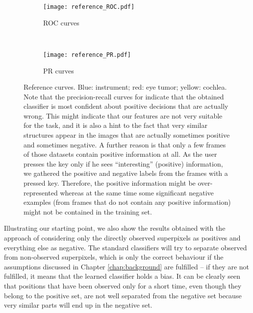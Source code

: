 \begin{figure}[ht]
	\centering
	\begin{subfigure}[h]{0.45\textwidth}
	\texttt{[image: reference\_ROC.pdf]}	
		\caption*{ROC curves}
	\end{subfigure}
	~
	\begin{subfigure}[h]{0.45\textwidth}
	\texttt{[image: reference\_PR.pdf]}	
		\caption*{PR curves}
	\end{subfigure}
	\caption{Reference curves. Blue: instrument; red: eye tumor; yellow: cochlea. Note that the precision-recall curves for indicate that the obtained classifier is most confident about positive decisions that are actually wrong. This might indicate that our features are not very suitable for the task, and it is also a hint to the fact that very similar structures appear in the images that are actually sometimes positive and sometimes negative. A further reason is that only a few frames of those datasets contain positive information at all. As the user presses the key only if he sees ``interesting'' (positive) information, we gathered the positive and negative labels from the frames with a pressed key. Therefore, the positive information might be over-represented whereas at the same time some significant negative examples (from frames that do not contain any positive information) might not be contained in the training set.}
	\label{fig:loss-functions-comparisons}
\end{figure}

Illustrating our starting point, we also show the results obtained with the approach of considering only the directly observed superpixels as positives and everything else as negative. The standard classifiers will try to separate observed from non-observed superpixels, which is only the correct behaviour if the assumptions discussed in Chapter \ref{chap:background} are fulfilled -- if they are not fulfilled, it means that the learned classifier holds a bias. It can be clearly seen that positions that have been observed only for a short time, even though they belong to the positive set, are not well separated from the negative set because very similar parts will end up in the negative set.




